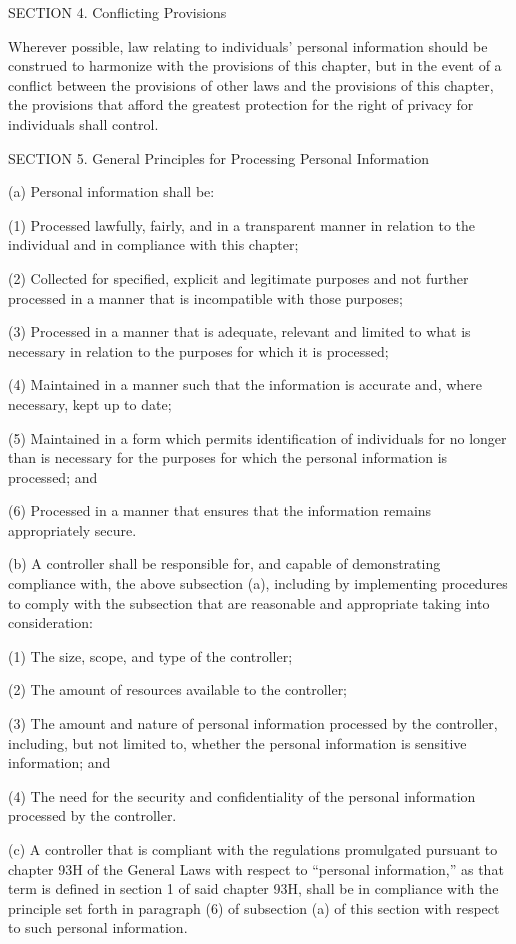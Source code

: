SECTION 4. Conflicting Provisions

Wherever possible, law relating to individuals’ personal information should be construed to harmonize with the provisions of this chapter, but in the event of a conflict between the provisions of other laws and the provisions of this chapter, the provisions that afford the greatest protection for the right of privacy for individuals shall control.

SECTION 5. General Principles for Processing Personal Information 

(a) Personal information shall be:

(1) Processed lawfully, fairly, and in a transparent manner in relation to the individual and in compliance with this chapter;

(2) Collected for specified, explicit and legitimate purposes and not further processed in a manner that is incompatible with those purposes;

(3) Processed in a manner that is adequate, relevant and limited to what is necessary in relation to the purposes for which it is processed;

(4) Maintained in a manner such that the information is accurate and, where necessary, kept up to date;

(5) Maintained in a form which permits identification of individuals for no longer than is necessary for the purposes for which the personal information is processed; and

(6) Processed in a manner that ensures that the information remains appropriately secure.

(b) A controller shall be responsible for, and capable of demonstrating compliance with, the above subsection (a), including by implementing procedures to comply with the subsection that are reasonable and appropriate taking into consideration:

(1) The size, scope, and type of the controller;

(2) The amount of resources available to the controller;

(3) The amount and nature of personal information processed by the controller, including, but not limited to, whether the personal information is sensitive information; and

(4) The need for the security and confidentiality of the personal information processed by the controller. 

(c) A controller that is compliant with the regulations promulgated pursuant to chapter 93H of the General Laws with respect to “personal information,” as that term is defined in section 1 of said chapter 93H, shall be in compliance with the principle set forth in paragraph (6) of subsection (a) of this section with respect to such personal information.

